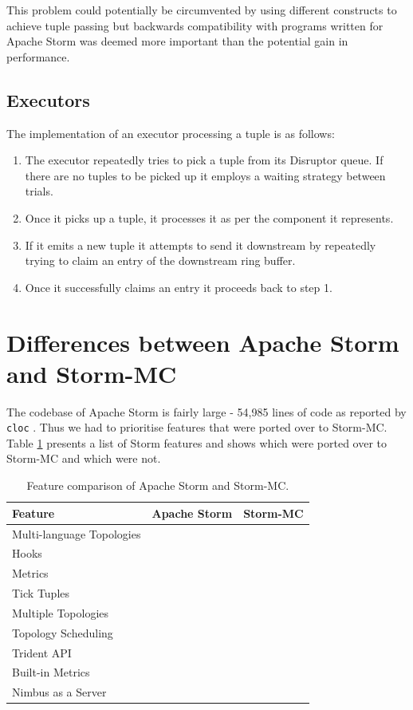 \documentclass[bsc,logo,frontabs,twoside,singlespacing,normalheadings,parskip]{infthesis}\usepackage[]{graphicx}\usepackage[]{color}
\newcommand{\cmark}{\ding{51}}\newcommand{\xmark}{\ding{55}}
\begin{document}
This problem could potentially be circumvented by using different constructs to achieve tuple passing but backwards compatibility with programs written for Apache Storm was deemed more important than the potential gain in performance.

\subsection{Executors}

The implementation of an executor processing a tuple is as follows:

\begin{enumerate}
	\item The executor repeatedly tries to pick a tuple from its Disruptor queue. If there are no tuples to be picked up it employs a waiting strategy between trials.
	\item Once it picks up a tuple, it processes it as per the component it represents.
	\item If it emits a new tuple it attempts to send it downstream by repeatedly trying to claim an entry of the downstream ring buffer.
	\item Once it successfully claims an entry it proceeds back to step 1.
\end{enumerate}

\section{Differences between Apache Storm and Storm-MC}
\label{sec:differences}

The codebase of Apache Storm is fairly large - 54,985 lines of code as reported by \texttt{cloc} \citep{Cloc}. Thus we had to prioritise features that were ported over to Storm-MC. Table \ref{table:features} presents a list of Storm features and shows which were ported over to Storm-MC and which were not.

\begin{table}[h!]
\centering
\small
\begin{tabular}{@{}lcc@{}}
    \textbf{Feature} & \textbf{Apache Storm} & \textbf{Storm-MC} \\ \toprule
    Multi-language Topologies & \cmark & \cmark \\
    Hooks & \cmark & \cmark \\
    Metrics & \cmark & \cmark \\
    Tick Tuples & \cmark & \cmark \\
    Multiple Topologies & \cmark & \xmark \\
    Topology Scheduling & \cmark & \xmark \\
	Trident API & \cmark & \xmark \\
    Built-in Metrics & \cmark & \xmark \\
    Nimbus as a Server & \cmark & \xmark \\
\end{tabular}
\caption{Feature comparison of Apache Storm and Storm-MC.}
\label{table:features}
\end{table}
\end{document}
